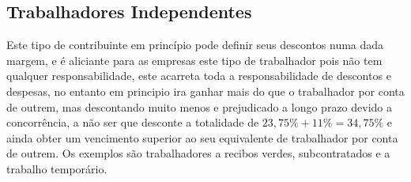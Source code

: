 \subsection{Trabalhadores Independentes}
\qquad Este tipo de contribuinte em princípio pode definir seus descontos numa dada margem, e é aliciante para as empresas este tipo de trabalhador pois não tem qualquer responsabilidade, este acarreta toda a responsabilidade de descontos e despesas, no entanto em principio ira ganhar mais do que o trabalhador por conta de outrem, mas descontando muito menos e prejudicado a longo prazo devido a concorrência, a não ser que desconte a totalidade de $23,75\%+11\%=34,75\%$ e ainda obter um vencimento superior ao seu equivalente de trabalhador por conta de outrem.
Os exemplos são trabalhadores a recibos verdes, subcontratados e a trabalho temporário.
